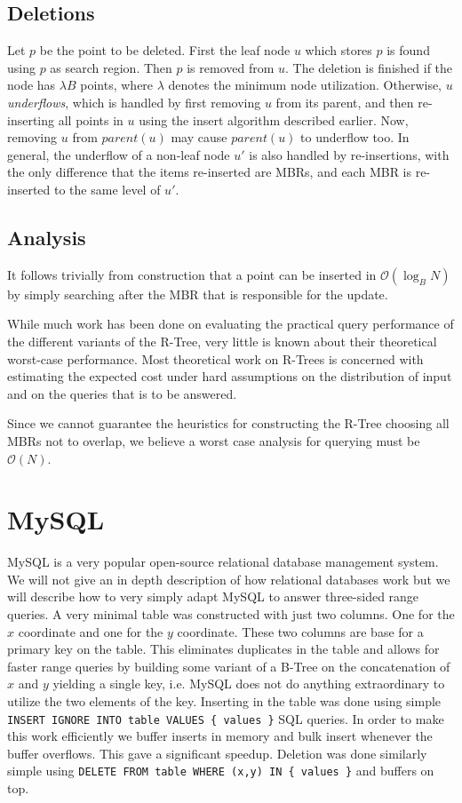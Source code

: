 \documentclass[twoside,11pt,openright]{report}
\begin{document}
\subsection{Deletions}
Let $p$ be the point to be deleted. First the leaf node $u$ which stores $p$ is found using $p$ as search region. Then $p$ is removed from $u$. The deletion is finished if the node has $\lambda B$ points, where $\lambda$ denotes the minimum node utilization. Otherwise, $u$ \textit{underflows}, which is handled by first removing $u$ from its parent, and then re-inserting all points in $u$ using the insert algorithm described earlier. Now, removing $u$ from $parent(u)$ may cause $parent(u)$ to underflow too. In general, the underflow of a non-leaf node $u'$ is also handled by re-insertions, with the only difference that the items re-inserted are MBRs, and each MBR is re-inserted to the same level of $u'$.

\subsection{Analysis}
It follows trivially from construction that a point can be inserted in $\mathcal{O}(\log_B N)$ by simply searching after the MBR that is responsible for the update.

While much work has been done on evaluating the practical query performance of the different variants of the R-Tree, very little is known about their theoretical worst-case performance. Most theoretical work on R-Trees is concerned with estimating the expected cost under hard assumptions on the distribution of input and on the queries that is to be answered.

Since we cannot guarantee the heuristics for constructing the R-Tree choosing all MBRs not to overlap, we believe a worst case analysis for querying must be $\mathcal{O}(N)$.

\section{MySQL}
\label{sec:mysql}
MySQL is a very popular open-source relational database management system. We will not give an in depth description of how relational databases work but we will describe how to very simply adapt MySQL to answer three-sided range queries. A very minimal table was constructed with just two columns. One for the $x$ coordinate and one for the $y$ coordinate. These two columns are base for a primary key on the table. This eliminates duplicates in the table and allows for faster range queries by building some variant of a B-Tree on the concatenation of $x$ and $y$ yielding a single key, i.e. MySQL does not do anything extraordinary to utilize the two elements of the key. Inserting in the table was done using simple \texttt{INSERT IGNORE INTO table VALUES \{ values \}} SQL queries. In order to make this work efficiently we buffer inserts in memory and bulk insert whenever the buffer overflows. This gave a significant speedup. Deletion was done similarly simple using \texttt{DELETE FROM table WHERE (x,y) IN \{ values \}} and buffers on top.
\end{document}

